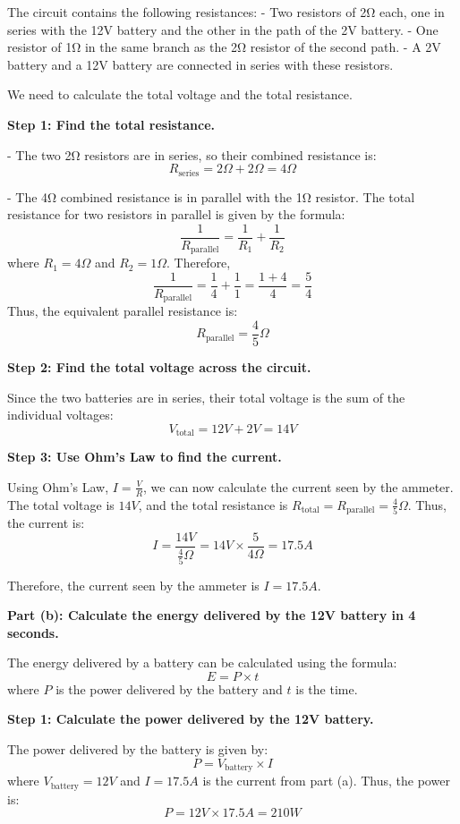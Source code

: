 The circuit contains the following resistances:
- Two resistors of 2Ω each, one in series with the 12V battery and the other in the path of the 2V battery.
- One resistor of 1Ω in the same branch as the 2Ω resistor of the second path.
- A 2V battery and a 12V battery are connected in series with these resistors.

We need to calculate the total voltage and the total resistance.

\textbf{Step 1: Find the total resistance.}

- The two 2Ω resistors are in series, so their combined resistance is:
  \[
  R_{\text{series}} = 2Ω + 2Ω = 4Ω
  \]

- The 4Ω combined resistance is in parallel with the 1Ω resistor. The total resistance for two resistors in parallel is given by the formula:
  \[
  \frac{1}{R_{\text{parallel}}} = \frac{1}{R_1} + \frac{1}{R_2}
  \]
  where \(R_1 = 4Ω\) and \(R_2 = 1Ω\). Therefore,
  \[
  \frac{1}{R_{\text{parallel}}} = \frac{1}{4} + \frac{1}{1} = \frac{1 + 4}{4} = \frac{5}{4}
  \]
  Thus, the equivalent parallel resistance is:
  \[
  R_{\text{parallel}} = \frac{4}{5}Ω
  \]

\textbf{Step 2: Find the total voltage across the circuit.}

Since the two batteries are in series, their total voltage is the sum of the individual voltages:
\[
V_{\text{total}} = 12V + 2V = 14V
\]

\textbf{Step 3: Use Ohm's Law to find the current.}

Using Ohm's Law, \(I = \frac{V}{R}\), we can now calculate the current seen by the ammeter. The total voltage is \(14V\), and the total resistance is \(R_{\text{total}} = R_{\text{parallel}} = \frac{4}{5}Ω\). Thus, the current is:
\[
I = \frac{14V}{\frac{4}{5}Ω} = 14V \times \frac{5}{4Ω} = 17.5A
\]

Therefore, the current seen by the ammeter is \(I = 17.5A\).

\textbf{Part (b): Calculate the energy delivered by the 12V battery in 4 seconds.}

The energy delivered by a battery can be calculated using the formula:
\[
E = P \times t
\]
where \(P\) is the power delivered by the battery and \(t\) is the time.

\textbf{Step 1: Calculate the power delivered by the 12V battery.}

The power delivered by the battery is given by:
\[
P = V_{\text{battery}} \times I
\]
where \(V_{\text{battery}} = 12V\) and \(I = 17.5A\) is the current from part (a). Thus, the power is:
\[
P = 12V \times 17.5A = 210W
\]

